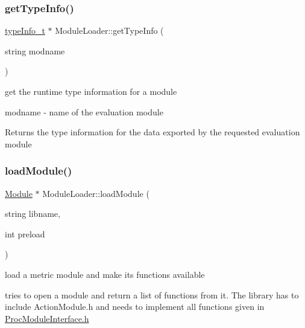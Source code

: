 \subsubsection{\texorpdfstring{get\+Type\+Info()}{getTypeInfo()}}
{\footnotesize\ttfamily \hyperlink{structtypeInfo__t}{type\+Info\+\_\+t} $\ast$ Module\+Loader\+::get\+Type\+Info (\begin{DoxyParamCaption}\item[{string}]{modname }\end{DoxyParamCaption})}



get the runtime type information for a module 

\begin{DoxyItemize}
\item {\ttfamily modname} -\/ name of the evaluation module \begin{DoxyReturn}{Returns}
the type information for the data exported by the requested evaluation module 
\end{DoxyReturn}
\end{DoxyItemize}
\mbox{\label{classModuleLoader_a494036ae2850f065ea0676f5b2351093}} 
\subsubsection{\texorpdfstring{load\+Module()}{loadModule()}}
{\footnotesize\ttfamily \hyperlink{classModule}{Module} $\ast$ Module\+Loader\+::load\+Module (\begin{DoxyParamCaption}\item[{string}]{libname,  }\item[{int}]{preload }\end{DoxyParamCaption})}



load a metric module and make its functions available 

tries to open a module and return a list of functions from it. The library has to include \textquotesingle{}Action\+Module.\+h\textquotesingle{} and needs to implement all functions given in \textquotesingle{}\hyperlink{ProcModuleInterface_8h}{Proc\+Module\+Interface.\+h}\textquotesingle{}

